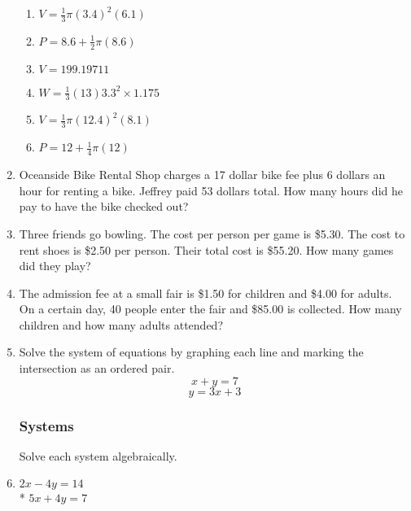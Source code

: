 \begin{enumerate}
\begin{multicols}{2}
\begin{enumerate}[itemsep=2cm]
    \item $V=\frac{1}{3} \pi (3.4)^2(6.1)$
    \item $P=8.6 + \frac{1}{2} \pi (8.6)$  
    \item $V=199.19711$
    \item $W=\frac{1}{3} (13)  3.3^2 \times 1.175$
    \item $V=\frac{1}{3} \pi (12.4)^2(8.1)$
    \item $P=12 + \frac{1}{4} \pi (12)$ 
  \end{enumerate}
  \end{multicols}\vspace{2cm}

\newpage
\item Oceanside Bike Rental Shop charges a 17 dollar bike fee plus 6 dollars an hour for renting a bike. Jeffrey paid 53 dollars total. How many hours did he pay to have the bike checked out? \vspace{6cm}

\item Three friends go bowling. The cost per person per game is \$5.30. The cost to rent shoes is \$2.50 per person. Their total cost is \$55.20. How many games did they play? \vspace{6cm}

\item The admission fee at a small fair is \$1.50 for children and \$4.00 for adults. On a certain day, 40 people enter the fair and \$85.00 is collected. How many children and how many adults attended?
  
\newpage
\item Solve the system of equations by graphing each line and marking the intersection as an ordered pair.
      \[x+y=7\]
      \[y=3x+3\]
  
  \begin{center} %
  \end{center}
  
\newpage
\subsubsection*{Systems}
Solve each system algebraically.
\item
$2x-4y=14$\\*
$5x+4y=7$ \vspace{6cm}


\end{enumerate}
